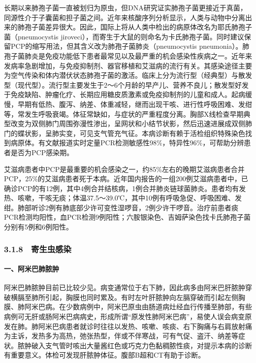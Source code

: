 长期以来肺孢子菌一直被划归为原虫，但DNA研究证实肺孢子菌更接近于真菌，同源性介于子囊菌和担子菌之间。近年来核酸序列分析显示，人类与动物中分离出来的肺孢子菌差异很大。因此，国际上将从人类中检出的病原体改名为耶氏肺孢子菌（pneumocystis
jiroveci），而寄生于大鼠的则命名为卡氏肺孢子菌。同时建议保留PCP的缩写用法，但其含义改为肺孢子菌肺炎（pneumocystis
pneumonia）。肺孢子菌肺炎是免疫功能低下患者最常见以及最严重的机会感染性疾病之一。近年来发病率急剧增加，与免疫抑制剂、器官移植和艾滋病的流行有关。其感染途径主要为空气传染和体内潜伏状态肺孢子菌的激活。临床上分为流行型（经典型）与散发型（现代型）。流行型主要发生于2～6个月龄的早产儿、营养不良儿；散发型好发于免疫缺陷、肿瘤化疗、长期应用糖皮质激素或免疫抑制剂的儿童和成人。起病缓慢，早期有低热、腹泻、纳差、体重减轻，继而出现干咳、进行性呼吸困难、发绀等，常发生呼吸衰竭。体征常缺如，与症状的严重程度分离。胸部X线检查早期典型改变为双侧肺门周围弥漫性渗出，呈网状和小结节状影，然后迅速进展成双侧肺门的蝶状影，呈肺实变，可见支气管充气征。本病诊断有赖于活检组织特殊染色找到病原体。有文献报道实时定量PCR检测敏感性98\%，特异性96\%，可帮助分辨患者是否为PCP感染期。

艾滋病患者中PCP是最重要的机会感染之一，约85\%左右的晚期艾滋病患者合并PCP，25\%的艾滋病患者死于本病。近年国内报告的一组200例艾滋病患者中，已确诊PCP的有12例，其中4例合并结核病，1例合并肺炎链球菌肺炎。患者均有发热、咳嗽，干咳无痰；体温37.5～39.0℃，其中10例有呼吸急促、呼吸困难、发绀。肺部听诊2例有肺底部少许可变性湿啰音，2例少许干啰音。治疗前患者痰PCR检测均阳性，血PCR检测9例阳性；六胺银染色、吉姆萨染色找卡氏肺孢子菌分别有5例和6例阳性。

\subsubsection{3.1.8　寄生虫感染}

\paragraph{一、阿米巴肺脓肿}

阿米巴肺脓肿目前已比较少见。病变通常位于右下肺，因此病多由阿米巴肝脓肿穿破横膈至肺所引起，胸膜也同时累及。有时左叶肝脓肿向左膈穿破而引起左侧胸膜、肺阿米巴病。在少数病例中，阿米巴原虫由肠道病灶经血行传播至肺部，有些病例可无肝或肠阿米巴病病史，形成所谓“原发性肺阿米巴病”，易使人误会病变原发在肺。肺阿米巴病患者就诊时往往以发热、咳嗽、咳痰、右下胸痛与右肩放射痛为主诉，发热多为高热，弛张热型，伴或不伴寒战，可有气促、盗汗、纳差等症状。脓肿破入支气管时咳出大量酱红色或巧克力色黏稠脓性痰，对提示本病的诊断有重要意义。体检可发现肝脓肿体征。腹部B超和CT有助于诊断。

